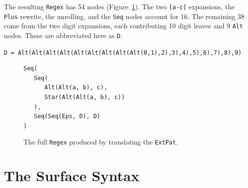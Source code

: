 The resulting \texttt{Regex} has 54 nodes
(Figure~\ref{fig:frontend-worked-regex}).
The two \texttt{[a-c]} expansions, the \texttt{Plus} rewrite,
the unrolling, and the \texttt{Seq} nodes account for 16.
The remaining 38 come from the two digit expansions,
each contributing 10 digit leaves and 9 \texttt{Alt} nodes.
These are abbreviated here as \texttt{D}:
\begin{center}
\texttt{D = Alt(Alt(Alt(Alt(Alt(Alt(Alt(Alt(Alt(0,1),2),3),4),5),6),7),8),9)}
\end{center}

\begin{figure}[ht]
\small
\centering
\begin{verbatim}
Seq(
   Seq(
      Alt(Alt(a, b), c),
      Star(Alt(Alt(a, b), c))
   ),
   Seq(Seq(Eps, D), D)
)
\end{verbatim}
\caption{The full \texttt{Regex} produced by translating the \texttt{ExtPat}.}
\label{fig:frontend-worked-regex}
\end{figure}

%
%
%
\section{The Surface Syntax}
\label{sec:surface-syntax}

